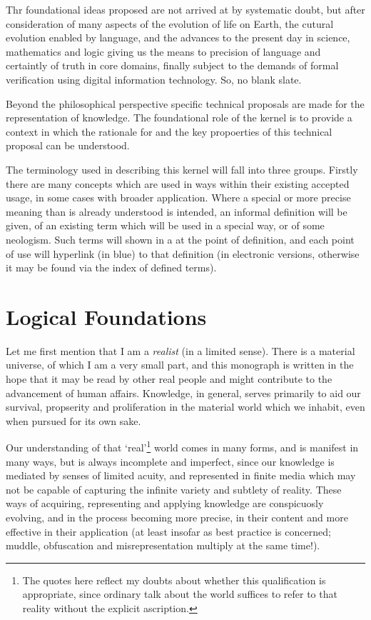 Thr foundational ideas proposed are not arrived at by systematic doubt, but after consideration of many aspects of the evolution of life on Earth, the cutural evolution enabled by language, and the advances to the present day in science, mathematics and logic giving us the means to precision of language and certaintly of truth in core domains, finally subject to the demands of formal verification using digital information technology.
So, no blank slate.

Beyond the philosophical perspective specific technical proposals are made for the representation of knowledge.
The foundational role of the kernel is to provide a context in which the rationale for and the key propoerties of this technical proposal can be understood.

The terminology used in describing this kernel will fall into three 
groups.
Firstly there are many concepts which are used in ways within their existing accepted usage, in some cases with broader application.
Where a special or more precise meaning than is already understood   is intended, an informal definition will be given, of an existing term which will be used in a special way, or of some neologism.
Such terms will shown in a  at the point of definition, and each point of use will hyperlink (in blue) to that definition (in electronic versions, otherwise it may be found via the index of defined terms).

\section{Logical Foundations}

Let me first mention that I am a \emph{realist} (in a limited sense).
There is a material universe, of which I am a very small part, and this monograph is written in the hope that it may be read by other real people and might contribute to the advancement of human affairs.
Knowledge, in general, serves primarily to aid our survival, propserity and proliferation in the material world which we inhabit, even when pursued for its own sake.

Our understanding of that `real'\footnote{The quotes here reflect my doubts about whether this qualification is appropriate, since ordinary talk about the world suffices to refer to that reality without the explicit ascription.}%
world comes in many forms, and is manifest in many ways, but is always incomplete and imperfect, since our knowledge is mediated by senses of limited acuity, and represented in finite media which may not be capable of capturing the infinite variety and subtlety of reality.
These ways of acquiring, representing and applying knowledge are conspicuosly evolving, and in the process becoming more precise, in their content and more effective in their application (at least insofar as best practice is concerned; muddle, obfuscation and misrepresentation multiply at the same time!).

